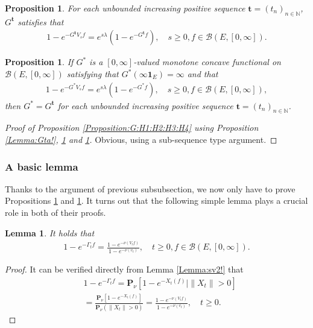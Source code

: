 \documentclass[12pt,a4paper]{amsart}
\numberwithin{equation}{section}
\theoremstyle{plain}
\newtheorem{lem}[thm]{Lemma}
\newtheorem{prop}[thm]{Proposition}
\theoremstyle{definition}
\theoremstyle{remark}
\begin{document}
\begin{prop} \label{Proposition:Gtb:H1:H2:H3:H4}
For each unbounded increasing positive sequence $\mathbf t = (t_n)_{n\in \mathbb N}$, $G^\mathbf t$ satisfies that
\begin{align}
 1 - e^{-G^\mathbf t V_s f}
 = e^{s\lambda} (1-e^{- G^\mathbf t f}),
 \quad s\geq 0, f\in \mathcal B(E,[0,\infty]).
 \end{align}
\end{prop}
\begin{prop} \label{Proposition:G*:H1:H2:H3:H4}
If $G^*$ is a $[0,\infty]$-valued monotone concave functional on $\mathcal B(E,[0,\infty])$ satisfying that $G^*(\infty \mathbf 1_E) = \infty$ and that
\begin{align}
 1 - e^{-G^* V_s f}
 = e^{s\lambda} (1 - e^{- G^* f}),
 \quad s\geq 0, f\in \mathcal B(E,[0,\infty]),
 \end{align}
then $G^* = G^\mathbf t$ for each unbounded increasing positive sequence $\mathbf t = (t_n)_{n\in \mathbb N}$.
\end{prop}
\begin{proof}[Proof of Proposition \ref{Proposition:G:H1:H2:H3:H4} using Proposition \ref{Lemma:Gta!}, \ref{Proposition:Gtb:H1:H2:H3:H4} and \ref{Proposition:G*:H1:H2:H3:H4}]
Obvious, using a sub-sequence type argument.
\end{proof}
\subsubsection{A basic lemma}
Thanks to the argument of previous subsubsection, we now only have to 
prove Propositions \ref{Proposition:Gtb:H1:H2:H3:H4} and \ref{Proposition:G*:H1:H2:H3:H4}.
It turns out that the following simple lemma plays a crucial role in both of their proofs.
\begin{lem} \label{Lemma:Gfnv!}
It holds that
\begin{align}
 1 - e^{- \Gamma_t f}
  = \frac{ 1 - e^{- \nu(V_tf)} }{ 1 - e^{- \nu(v_t)}},
  \quad t \geq 0, f\in \mathcal B(E,[0,\infty]).
 \end{align}
\end{lem}
\begin{proof}
It can be verified directly from Lemma \ref{Lemma:sv2!} that
\begin{align}
 & 1 - e^{- \Gamma_t f}
   = \mathbf P_\nu [ 1 - e^{-X_t(f)} | \|X_t\|> 0] \\
  & = \frac{ \mathbf P_\nu [ 1 - e^{- X_t(f)}]}{ \mathbf P_\nu (\|X_t\| > 0)}
  = \frac{ 1 - e^{- \nu(V_tf)} }{ 1 - e^{- \nu(v_t)}},
  \quad t \geq 0.
 \end{align}
\end{proof}
\end{document}
